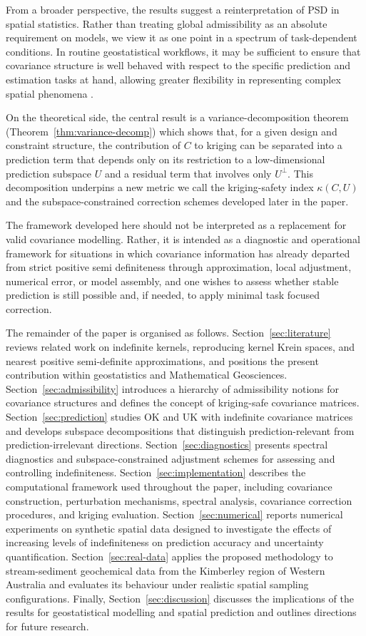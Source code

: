\documentclass[smallextended]{svjour3}
\newcommand{\1}{\mathbf{1}}
\begin{document}
From a broader perspective, the results suggest a reinterpretation of PSD in spatial statistics. Rather than treating global admissibility as an absolute requirement on models, we view it as one point in a spectrum of task-dependent conditions. In routine geostatistical workflows, it may be sufficient to ensure that covariance structure is well behaved with respect to the specific prediction and estimation tasks at hand, allowing greater flexibility in representing complex spatial phenomena \citep[cf.][]{stein1999}. 

On the theoretical side, the central result is a variance-decomposition theorem (Theorem~\ref{thm:variance-decomp}) which shows that, for a given design and constraint structure, the contribution of $C$ to kriging can be separated into a prediction term that depends only on its restriction to a low-dimensional prediction subspace $U$ and a residual term that involves only $U^\perp$. This decomposition underpins a new metric we call the kriging-safety index $\kappa(C,U)$ and the subspace-constrained correction schemes developed later in the paper.

The framework developed here should not be interpreted as a replacement for valid covariance modelling. Rather, it is intended as a diagnostic and operational framework for situations in which covariance information has already departed from strict positive semi definiteness through approximation, local adjustment, numerical error, or model assembly, and one wishes to assess whether stable prediction is still possible and, if needed, to apply minimal task focused correction.

The remainder of the paper is organised as follows. Section~\ref{sec:literature} reviews related work on indefinite kernels, reproducing kernel Krein spaces, and nearest positive semi-definite approximations, and positions the present contribution within geostatistics and Mathematical Geosciences.  Section~\ref{sec:admissibility} introduces a hierarchy of admissibility notions for covariance structures and defines the concept of kriging-safe covariance matrices. Section~\ref{sec:prediction} studies OK and UK with indefinite covariance matrices and develops subspace decompositions that distinguish prediction-relevant from prediction-irrelevant directions. Section~\ref{sec:diagnostics} presents spectral diagnostics and subspace-constrained adjustment schemes for assessing and controlling indefiniteness. Section~\ref{sec:implementation} describes the computational framework used throughout the paper, including covariance construction, perturbation mechanisms, spectral analysis, covariance correction procedures, and kriging evaluation. Section~\ref{sec:numerical} reports numerical experiments on synthetic spatial data designed to investigate the effects of increasing levels of indefiniteness on prediction accuracy and uncertainty quantification. Section~\ref{sec:real-data} applies the proposed methodology to stream-sediment geochemical data from the Kimberley region of Western Australia and evaluates its behaviour under realistic spatial sampling configurations. Finally, Section~\ref{sec:discussion} discusses the implications of the results for geostatistical modelling and spatial prediction and outlines directions for future research.
		
\end{document}
